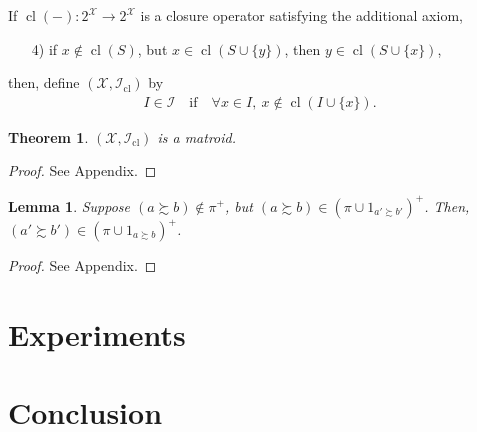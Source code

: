 \documentclass[conference]{ieeeconf}
\newcommand{\powerset}[1]{2^{#1}}
\newcommand{\X}{\mathcal{X}}
\newcommand{\I}{\mathcal{I}}
\newcommand{\prefers}{\succsim}
\DeclareMathOperator{\cl}{cl}
\newtheorem{theorem}{Theorem}
\newtheorem{lemma}{Lemma}
\begin{document}
If $\cl(-): \powerset{\X} \to \powerset{\X}$ is a closure operator satisfying the additional axiom,
\begin{enumerate}
    \item[4)] if $x \notin \cl(S)$, but $x \in \cl(S \cup \{y\})$, then $y \in \cl(S \cup \{x\})$,
\end{enumerate}
then, define $(\X,\I_{\cl})$ by
\begin{align*}
    I \in \I \quad \text{if} \quad \forall x \in I,~x \notin \cl(I \cup \{x\}).
\end{align*}
\begin{theorem}
    $(\X, \I_{\cl})$ is a matroid.
\end{theorem}
\begin{proof}
    See Appendix.
\end{proof}

\begin{lemma}
    Suppose $(a \prefers b) \notin \pi^{+}$, but $(a \prefers b) \in \left(\pi \cup 1_{a' \prefers b'}\right)^{+}$. Then, $(a' \prefers b') \in \left( \pi \cup 1_{a \prefers b} \right)^{+}$.
\end{lemma}
\begin{proof}
    See Appendix.
\end{proof}

\section{Experiments}
\label{sec:experiments}


\section{Conclusion}





\appendix
\end{document}
